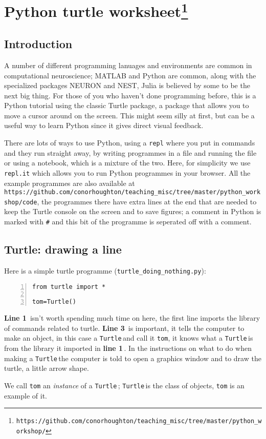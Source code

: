 \documentclass[11pt,a4paper]{scrartcl}
\newcommand{\turtle}{\texttt{Turtle}\,}
\newcommand{\lnn}[1]{\textbf{line #1}\,}
\newcommand{\Lnn}[1]{\textbf{Line #1}\,}
\begin{document}
\section*{Python turtle worksheet\footnote{\texttt{https://github.com/conorhoughton/teaching\_misc/tree/master/python\_workshop/}}}
\subsection*{Introduction}
A number of different programming lanuages and environments are common
in computational neuroscience; MATLAB and Python are common, along
with the specialized packages NEURON and NEST, Julia is believed by
some to be the next big thing. For those of you who haven't done
programming before, this is a Python tutorial using the classic Turtle
package, a package that allows you to move a cursor around on the
screen. This might seem silly at first, but can be a useful way to
learn Python since it gives direct visual feedback.

There are lots of ways to use Python, using a \texttt{repl} where you
put in commands and they run straight away, by writing programmes in a
file and running the file or using a notebook, which is a mixture of
the two. Here, for simplicity we use \texttt{repl.it} which allows you
to run Python programmes in your browser. All the example programmes
are also available at \texttt{https://github.com/conorhoughton/teaching\_misc/tree/master/python\_workshop/code}, the programmes there have extra lines
at the end that are needed to keep the Turtle console on the screen
and to save figures; a comment in Python is marked with \texttt{\#}
and this bit of the programme is seperated off with a comment.

\subsection*{Turtle: drawing a line}

Here is a simple turtle programme (\texttt{turtle\_doing\_nothing.py}):
\begin{lstlisting}[numbers=left]
from turtle import *

tom=Turtle()

\end{lstlisting}
\Lnn{1} isn't worth spending much time on here, the first line imports
the library of commands related to turtle. \Lnn{3} is important, it
tells the computer to make an object, in this case a \turtle and call
it \texttt{tom}, it knows what a \turtle is from the library it
imported in \lnn{1}. In the instructions on what to do when making a
\turtle the computer is told to open a graphics window and to draw the
turtle, a little arrow shape.
\begin{center}
\end{center}
We call \texttt{tom} an \textsl{instance} of a \turtle; \turtle is the class of
objects, \texttt{tom} is an example of it.
\end{document}

